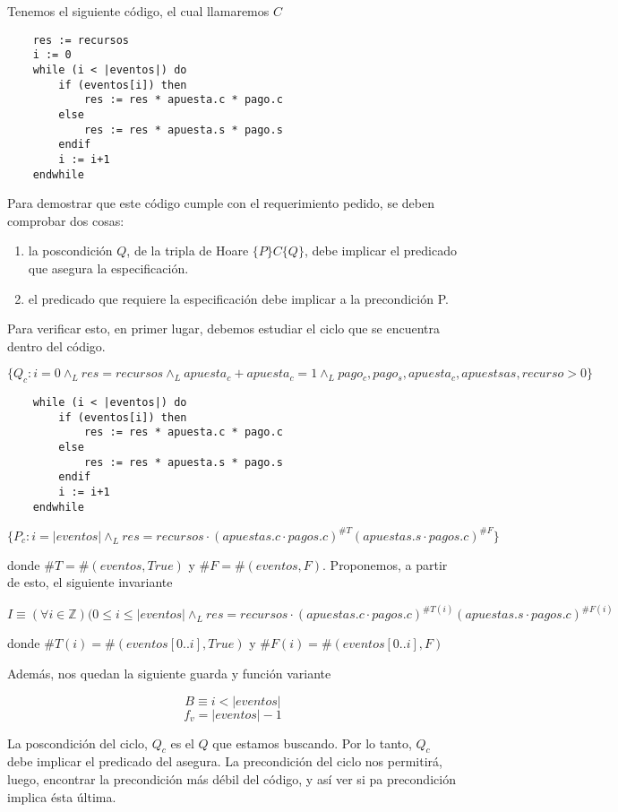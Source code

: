 \documentclass[../document.tex]{subfiles}
\begin{document}
Tenemos el siguiente código, el cual llamaremos $C$
\begin{verbatim}
    res := recursos
    i := 0
    while (i < |eventos|) do
        if (eventos[i]) then
            res := res * apuesta.c * pago.c
        else
            res := res * apuesta.s * pago.s
        endif
        i := i+1
    endwhile
\end{verbatim}

Para demostrar que este código cumple con el requerimiento pedido, se deben comprobar dos cosas:

\begin{enumerate}
    \item la poscondición $Q$, de la tripla de Hoare $\{P\}C\{Q\}$, debe implicar el predicado que asegura la especificación.
    \item el predicado que requiere la especificación debe implicar a la precondición {P}.
\end{enumerate}

Para verificar esto, en primer lugar, debemos estudiar el ciclo que se encuentra dentro del código.

$\{Q_c: i = 0 \land_{L} res = recursos \land_{L} apuesta_{c}+apuesta_{c}=1 \land_{L} pago_{c},pago_{s},apuesta_{c},apuestsa{s},recurso>0\}$
\begin{verbatim}
    while (i < |eventos|) do
        if (eventos[i]) then
            res := res * apuesta.c * pago.c
        else
            res := res * apuesta.s * pago.s
        endif
        i := i+1
    endwhile
\end{verbatim}
$\{P_c: i = |eventos| \land_{L} res = recursos \cdot (apuestas.c\cdot pagos.c)^{\#T}(apuestas.s\cdot pagos.c)^{\#F}\}$

donde $\#T = \#(eventos, True)$ y $\#F = \#(eventos, F)$. Proponemos, a partir de esto, el siguiente invariante

$$I \equiv (\forall i \in \mathbb{Z})(0\leq i \leq |eventos| \land_L res = recursos \cdot (apuestas.c\cdot pagos.c)^{\#T(i)}(apuestas.s\cdot pagos.c)^{\#F(i)}$$

donde $\#T(i) = \#(eventos[0..i], True)$ y $\#F(i) = \#(eventos[0..i], F)$

Además, nos quedan la siguiente guarda y función variante

$$B \equiv i < |eventos|$$
$$f_v = |eventos|-1$$

La poscondición del ciclo, $Q_c$ es el $Q$ que estamos buscando. Por lo tanto, $Q_c$ debe implicar el predicado del asegura. La precondición del ciclo nos permitirá, luego, encontrar la precondición más débil del código, y así ver si pa precondición implica ésta última.
\end{document}
